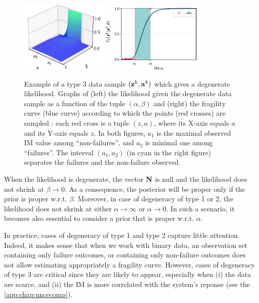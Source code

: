 \begin{figure}[h]
    \centering
    \includegraphics[width=4.6cm]{figures/PREM/likelihood_degen.pdf}\qquad
    \includegraphics[width=4.44cm]{figures/PREM/degeneracy.pdf}
    \caption{{Example of a type 3 data sample $(\mathbf{z}^k,\mathbf{a}^k)$ which gives a degenerate likelihood. Graphs of (left) the likelihood given the degenerate data sample as a function of the tuple $(\alpha,\beta)$ and (right) the fragility curve (blue curve) according to which the points (red crosses) are sampled : each red cross is a tuple $(z,a)$, where its X-axis equals $a$ and its Y-axis equals $z$.}
    In both figures, $a_1$ is the maximal observed IM value among ``non-failures'', and $a_2$ is minimal one among ``failures''.
    The interval $(a_1,a_2)$ (in cyan in the right figure) separates the failures and the non-failure observed.
    }
    \label{fig:constr-frags:degenerate-frag}
\end{figure}



When the likelihood is degenerate, the vector $\mathbf{N}$ is null and the likelihood does not shrink at $\beta\to0$.
As a consequence, the posterior will be proper only if the prior is proper w.r.t. $\beta$.
Moreover, in case of degeneracy of type 1 or 2, the likelihood does not shrink at either $\alpha\to\infty$ or $\alpha\to0$. In such a scenario, it becomes also essential to consider a prior that is proper  w.r.t. $\alpha$.

In practice, cases of degeneracy of type 1 and type 2 capture little attention. 
Indeed, it makes sense that when we work with binary data, an observation set containing only failure outcomes, or containing only non-failure outcomes does not allow estimating appropriately a fragility curve.
However, cases of degeneracy of type 3 are critical since they are likely to appear, especially when (i) the data are scarce, and (ii) the IM is more correlated with the system's reponse (see the \cref{app:chap:uncecomp}).


